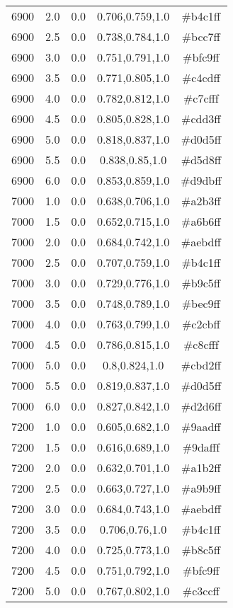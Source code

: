 \begin{tabular}{ccccc}
6900 & 2.0 & 0.0 & 0.706,0.759,1.0 & \#b4c1ff \\ 
6900 & 2.5 & 0.0 & 0.738,0.784,1.0 & \#bcc7ff \\ 
6900 & 3.0 & 0.0 & 0.751,0.791,1.0 & \#bfc9ff \\ 
6900 & 3.5 & 0.0 & 0.771,0.805,1.0 & \#c4cdff \\ 
6900 & 4.0 & 0.0 & 0.782,0.812,1.0 & \#c7cfff \\ 
6900 & 4.5 & 0.0 & 0.805,0.828,1.0 & \#cdd3ff \\ 
6900 & 5.0 & 0.0 & 0.818,0.837,1.0 & \#d0d5ff \\ 
6900 & 5.5 & 0.0 & 0.838,0.85,1.0 & \#d5d8ff \\ 
6900 & 6.0 & 0.0 & 0.853,0.859,1.0 & \#d9dbff \\ 
7000 & 1.0 & 0.0 & 0.638,0.706,1.0 & \#a2b3ff \\ 
7000 & 1.5 & 0.0 & 0.652,0.715,1.0 & \#a6b6ff \\ 
7000 & 2.0 & 0.0 & 0.684,0.742,1.0 & \#aebdff \\ 
7000 & 2.5 & 0.0 & 0.707,0.759,1.0 & \#b4c1ff \\ 
7000 & 3.0 & 0.0 & 0.729,0.776,1.0 & \#b9c5ff \\ 
7000 & 3.5 & 0.0 & 0.748,0.789,1.0 & \#bec9ff \\ 
7000 & 4.0 & 0.0 & 0.763,0.799,1.0 & \#c2cbff \\ 
7000 & 4.5 & 0.0 & 0.786,0.815,1.0 & \#c8cfff \\ 
7000 & 5.0 & 0.0 & 0.8,0.824,1.0 & \#cbd2ff \\ 
7000 & 5.5 & 0.0 & 0.819,0.837,1.0 & \#d0d5ff \\ 
7000 & 6.0 & 0.0 & 0.827,0.842,1.0 & \#d2d6ff \\ 
7200 & 1.0 & 0.0 & 0.605,0.682,1.0 & \#9aadff \\ 
7200 & 1.5 & 0.0 & 0.616,0.689,1.0 & \#9dafff \\ 
7200 & 2.0 & 0.0 & 0.632,0.701,1.0 & \#a1b2ff \\ 
7200 & 2.5 & 0.0 & 0.663,0.727,1.0 & \#a9b9ff \\ 
7200 & 3.0 & 0.0 & 0.684,0.743,1.0 & \#aebdff \\ 
7200 & 3.5 & 0.0 & 0.706,0.76,1.0 & \#b4c1ff \\ 
7200 & 4.0 & 0.0 & 0.725,0.773,1.0 & \#b8c5ff \\ 
7200 & 4.5 & 0.0 & 0.751,0.792,1.0 & \#bfc9ff \\ 
7200 & 5.0 & 0.0 & 0.767,0.802,1.0 & \#c3ccff \\ 

\end{tabular}
